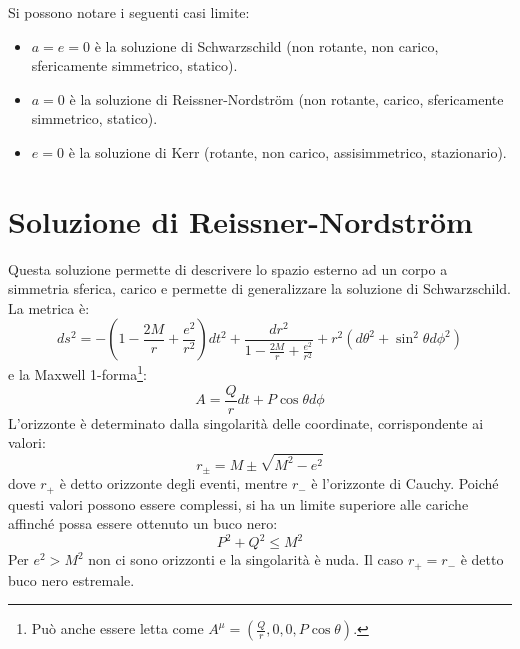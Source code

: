 Si possono notare i seguenti casi limite:
\begin{itemize}
    \item $a = e = 0$ è la soluzione di Schwarzschild (non rotante, non carico, sfericamente simmetrico, statico).
    \item $a = 0$ è la soluzione di Reissner-Nordstr\"om (non rotante, carico, sfericamente simmetrico, statico).
    \item $e=0$ è la soluzione di Kerr (rotante, non carico, assisimmetrico, stazionario).
\end{itemize}
\section{Soluzione di Reissner-Nordstr\"om}
Questa soluzione permette di descrivere lo spazio esterno ad un corpo a simmetria sferica, carico e permette di generalizzare la soluzione di Schwarzschild. La metrica è:
\begin{equation}
    ds^2 = - \left(1 - \frac{2M}{r} + \frac{e^2}{r^2}\right)dt^2 + \frac{dr^2}{1 - \frac{2M}{r} + \frac{e^2}{r^2}} + r^2(d\theta^2 + \sin^2\theta d\phi^2)
    \label{eq.metrica_rn}
\end{equation}
e la Maxwell 1-forma\footnote{Può anche essere letta come $A^\mu = (\frac{Q}{r},0,0,P\cos\theta)$.}:
\begin{equation*}
    A = \frac{Q}{r}dt + P\cos \theta d\phi
\end{equation*}
L'orizzonte è determinato dalla singolarità delle coordinate, corrispondente ai valori:
\begin{equation*}
  r_{\pm} = M \pm \sqrt{M^2 - e^2}  
\end{equation*}
dove $r_+$ è detto orizzonte degli eventi, mentre $r_-$ è l'orizzonte di Cauchy. 
Poiché questi valori possono essere complessi, si ha un limite superiore alle cariche affinché possa essere ottenuto un buco nero:
\begin{equation*}
    P^2 + Q^2 \leq M^2
\end{equation*}
Per $e^2 > M^2$ non ci sono orizzonti e la singolarità è nuda. Il caso $r_+ = r_-$ è detto buco nero estremale.

